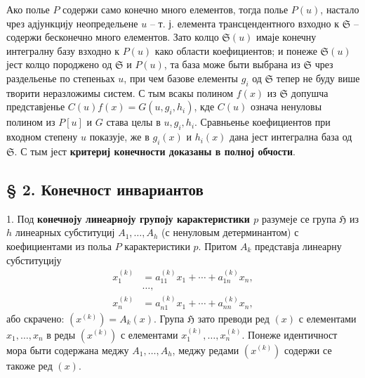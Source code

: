 ﻿\documentclass[11pt]{article}
\begin{document}
Ако полье $P$ содержи само конечно много елементов, тогда полье $P(u)$, настало чрез адјункцију неопредельене $u$ -- т. ј. елемента трансцендентного взходно к $\mathfrak S$ -- содержи бесконечно много елементов. Зато колцо $\mathfrak S(u)$ имаје конечну интегралну базу взходно к $P(u)$ како области коефициентов; и понеже $\mathfrak S(u)$ јест колцо породжено од $\mathfrak S$ и $P(u)$, та база може быти выбрана из $\mathfrak S$ чрез раздельенье по степеньах $u$, при чем базове елементы $g_i$ од $\mathfrak S$ тепер не буду више творити неразложимы систем. С тым всакы полином $f(x)$ из $\mathfrak S$ допушча представјенье $C(u)f(x)=G(u,g_i,h_i)$, кде $C(u)$ означа ненуловы полином из $P[u]$ и $G$ става целы в $u,g_i,h_i$. Сравньенье коефициентов при входном степену $u$ показује, же в $g_i(x)$ и $h_i(x)$ дана јест интегрална база од $\mathfrak S$. С тым јест \textbf{критериј конечности доказаны в полној обчости}.

\subsection*{§ 2. Конечност инвариантов}

1. Под \textbf{конечноју линеарноју групоју карактеристики $p$} разумеје се група $\mathfrak H$ из $h$ линеарных субституциј $A_1,\ldots,A_h$ (с ненуловым детерминантом) с коефициентами из польа $P$ карактеристики $p$. Притом $A_k$ представја линеарну субституцију
\[
\begin{aligned}
 x_1^{(k)}&=a_{11}^{(k)}x_1+\cdots+a_{1n}^{(k)}x_n,\\[-0.2em]
 &\ldots,\\
 x_n^{(k)}&=a_{n1}^{(k)}x_1+\cdots+a_{nn}^{(k)}x_n,
\end{aligned}
\]
або скрачено: $(x^{(k)})=A_k(x)$. Група $\mathfrak H$ зато преводи ред $(x)$ с елементами $x_1,\ldots,x_n$ в реды $(x^{(k)})$ с елементами $x_1^{(k)},\ldots,x_n^{(k)}$. Понеже идентичност мора быти содержана меджу $A_1,\ldots,A_h$, меджу редами $(x^{(k)})$ содержи се такоже ред $(x)$.
\end{document}
